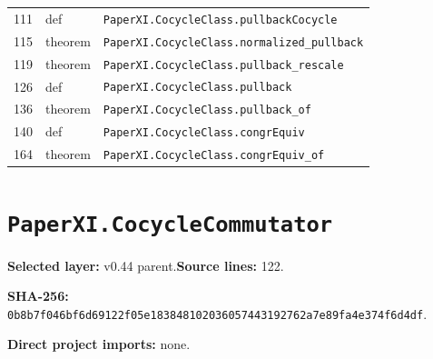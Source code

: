\documentclass[10pt,oneside]{book}
\begin{document}
\begin{longtable}{@{}p{}p{}p{}@{}}
111&def&\nolinkurl{PaperXI.CocycleClass.pullbackCocycle}\\

115&theorem&\nolinkurl{PaperXI.CocycleClass.normalized_pullback}\\

119&theorem&\nolinkurl{PaperXI.CocycleClass.pullback_rescale}\\

126&def&\nolinkurl{PaperXI.CocycleClass.pullback}\\

136&theorem&\nolinkurl{PaperXI.CocycleClass.pullback_of}\\

140&def&\nolinkurl{PaperXI.CocycleClass.congrEquiv}\\

164&theorem&\nolinkurl{PaperXI.CocycleClass.congrEquiv_of}\\

\bottomrule\end{longtable}

\section{\texorpdfstring{\nolinkurl{PaperXI.CocycleCommutator}}{PaperXI.CocycleCommutator}}\label{module:PaperXI.CocycleCommutator}

\textbf{Selected layer:} v0.44 parent.\quad\textbf{Source lines:} 122.\par\textbf{SHA-256:} {\scriptsize\nolinkurl{0b8b7f046bf6d69122f05e183848102036057443192762a7e89fa4e374f6d4df}}.


\textbf{Direct project imports:} none.
\end{document}
